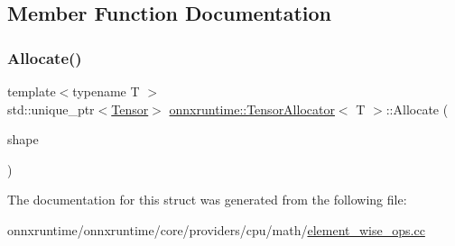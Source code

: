 \subsection{Member Function Documentation}
\mbox{\label{structonnxruntime_1_1TensorAllocator_aa1ba9d90a6b38db105c0dea00a682788}} 
\subsubsection{\texorpdfstring{Allocate()}{Allocate()}}
{\footnotesize\ttfamily template$<$typename T $>$ \\
std\+::unique\+\_\+ptr$<$\mbox{\hyperlink{classonnxruntime_1_1Tensor}{Tensor}}$>$ \mbox{\hyperlink{structonnxruntime_1_1TensorAllocator}{onnxruntime\+::\+Tensor\+Allocator}}$<$ T $>$\+::Allocate (\begin{DoxyParamCaption}\item[{const \mbox{\hyperlink{classonnxruntime_1_1TensorShape}{Tensor\+Shape}} \&}]{shape }\end{DoxyParamCaption})\hspace{0.3cm}{\ttfamily [inline]}}



The documentation for this struct was generated from the following file\+:\begin{DoxyCompactItemize}
\item 
onnxruntime/onnxruntime/core/providers/cpu/math/\mbox{\hyperlink{element__wise__ops_8cc}{element\+\_\+wise\+\_\+ops.\+cc}}\end{DoxyCompactItemize}
